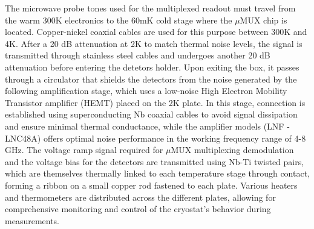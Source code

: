 The microwave probe tones used for the multiplexed readout must travel from the warm 300K electronics to the 60mK cold
stage where the $\mu$MUX chip is located. Copper-nickel coaxial cables are used for this purpose between 300K and 4K.
After a 20 dB attenuation at 2K to match thermal noise levels, the signal is transmitted
through stainless steel cables and undergoes another 20 dB attenuation before entering the detetors holder. Upon exiting
the box, it passes through a circulator that shields the detectors from the noise generated by the following amplification stage, which uses a low-noise High Electron Mobility
Transistor amplifier (HEMT) placed on the 2K plate. In this stage,
connection is established using superconducting Nb coaxial cables to avoid signal dissipation and ensure minimal thermal
conductance, while the amplifier models (LNF - LNC48A) offers optimal noise performance in the working frequency range
of 4-8 GHz. 
The voltage ramp signal required for $\mu$MUX multiplexing demodulation and the voltage bias for the detectors are transmitted using Nb-Ti twisted pairs, which are themselves thermally linked to each temperature stage through contact, forming a ribbon on a small copper rod fastened to each plate.
Various heaters and thermometers are distributed across the different plates, allowing for comprehensive monitoring and control of the cryostat's behavior during measurements.



